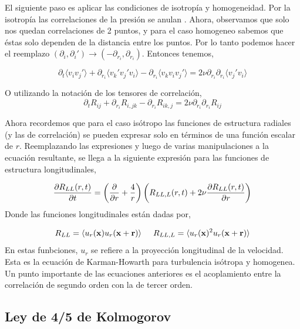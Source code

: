 \documentclass[executivepaper,12pt]{article}
\numberwithin{equation}{section}
\begin{document}
El siguiente paso es aplicar las condiciones de isotropía y homogeneidad. Por la isotropía las correlaciones de la presión se anulan \parencite{monin1976,argyris2015}. Ahora, observamos que solo nos quedan correlaciones de 2 puntos, y para el caso homogeneo sabemos que éstas solo dependen de la distancia entre los puntos. Por lo tanto podemos hacer el reemplazo $(\partial_i,\partial_i')\to(-\partial_{r_i},\partial_{r_i})$. Entonces tenemos,


\begin{equation*}
	\partial_t\langle v_iv_j' \rangle+\partial_{r_i}\langle v_k'v_j'v_i\rangle-\partial_{r_i}\langle v_kv_iv_j'\rangle= 2\nu \partial_{r_i}\partial_{r_i}\langle v_j'v_i \rangle
\end{equation*}

O utilizando la notación de los tensores de correlación,
\begin{equation}
	\partial_tR_{ij}+\partial_{r_i}R_{i,jk}-\partial_{r_i}R_{ik,j}= 2\nu \partial_{r_i}\partial_{r_i}R_{ij}
\end{equation}

Ahora recordemos que para el caso isótropo las funciones de estructura radiales (y las de correlación) se pueden expresar solo en términos de una función escalar de $r$. Reemplazando las expresiones y luego de varias manipulaciones a la ecuación resultante, se llega a la siguiente expresión para las funciones de estructura longitudinales,

\begin{equation}
	\pdv{R_{LL}(r,t)}{t}=\left(\pdv{}{r}+\frac{4}{r}\right)\left(R_{LL,L}(r,t)+2\nu\pdv{R_{LL}(r,t)}{r}\right)
	\label{eq.KH.IH}
\end{equation}
 Donde las funciones longitudinales están dadas por,
 
 \begin{equation*}
 	R_{LL}=\langle u_r(\vb{x})u_r(\vb{x}+\vb{r}) \rangle \hspace{0.5cm} R_{LL,L}=\langle u_r(\vb{x})^2u_r(\vb{x}+\vb{r}) \rangle
 \end{equation*}
 En estas funbciones, $u_r$ se refiere a la proyección longitudinal de la velocidad. \\
 Esta es la ecuación de Karman-Howarth para turbulencia isótropa y homogenea. Un punto importante de las ecuaciones anteriores es el acoplamiento entre la correlación de segundo orden con la de tercer orden. 
 
\subsection{Ley de 4/5 de Kolmogorov}
\end{document}
